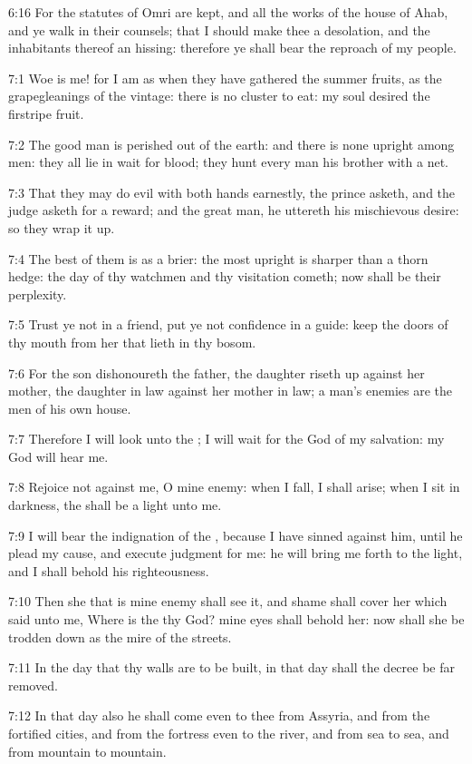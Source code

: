 6:16 For the statutes of Omri are kept, and all the works of the house
of Ahab, and ye walk in their counsels; that I should make thee a
desolation, and the inhabitants thereof an hissing: therefore ye shall
bear the reproach of my people.

7:1 Woe is me! for I am as when they have gathered the summer fruits,
as the grapegleanings of the vintage: there is no cluster to eat: my
soul desired the firstripe fruit.

7:2 The good man is perished out of the earth: and there is none
upright among men: they all lie in wait for blood; they hunt every man
his brother with a net.

7:3 That they may do evil with both hands earnestly, the prince
asketh, and the judge asketh for a reward; and the great man, he
uttereth his mischievous desire: so they wrap it up.

7:4 The best of them is as a brier: the most upright is sharper than a
thorn hedge: the day of thy watchmen and thy visitation cometh; now
shall be their perplexity.

7:5 Trust ye not in a friend, put ye not confidence in a guide: keep
the doors of thy mouth from her that lieth in thy bosom.

7:6 For the son dishonoureth the father, the daughter riseth up
against her mother, the daughter in law against her mother in law; a
man's enemies are the men of his own house.

7:7 Therefore I will look unto the \LORD; I will wait for the God of my
salvation: my God will hear me.

7:8 Rejoice not against me, O mine enemy: when I fall, I shall arise;
when I sit in darkness, the \LORD shall be a light unto me.

7:9 I will bear the indignation of the \LORD, because I have sinned
against him, until he plead my cause, and execute judgment for me: he
will bring me forth to the light, and I shall behold his
righteousness.

7:10 Then she that is mine enemy shall see it, and shame shall cover
her which said unto me, Where is the \LORD thy God? mine eyes shall
behold her: now shall she be trodden down as the mire of the streets.

7:11 In the day that thy walls are to be built, in that day shall the
decree be far removed.

7:12 In that day also he shall come even to thee from Assyria, and
from the fortified cities, and from the fortress even to the river,
and from sea to sea, and from mountain to mountain.

